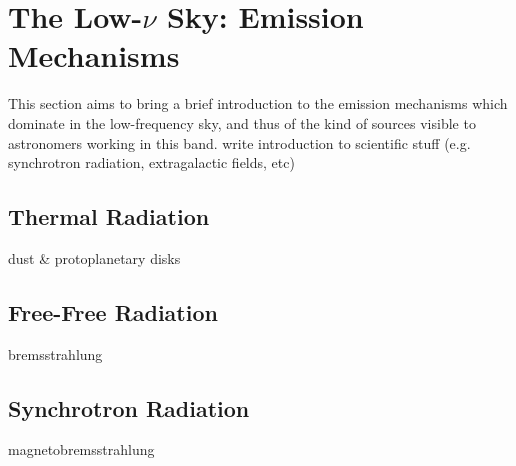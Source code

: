 \section{The Low-$\nu$ Sky: Emission Mechanisms}
\pg
This section aims to bring a brief introduction to the emission mechanisms which dominate in the low-frequency sky, and thus of the kind of sources visible to astronomers working in this band. 
write introduction to scientific stuff (e.g. synchrotron radiation, extragalactic fields, etc)

\subsection{Thermal Radiation}
\pg
dust \& protoplanetary disks


\subsection{Free-Free Radiation}
\pg
bremsstrahlung

\subsection{Synchrotron Radiation}
\pg
magnetobremsstrahlung

